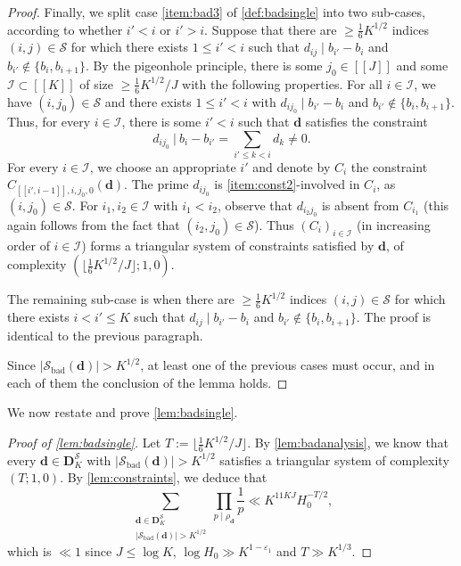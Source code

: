 \documentclass[11pt]{amsart}
\theoremstyle{definition}
\renewcommand{\leq}{\leqslant}
\renewcommand{\geq}{\geqslant}
\newcommand{\interval}[2]{[\![#1,#2]\!] }
\newcommand{\sinterval}[1]{[\![#1]\!] }
\newcommand{\abs}[1]{\left|#1\right|}
\newcommand{\eps}{\varepsilon}
\renewcommand{\d}{\boldsymbol{d}}
\newcommand{\pcomp}[2]{d_{#1#2}}
\newcommand{\cstH}{\eps_1}
\newcommand{\sommespart}{b}
\newcommand{\fprod}[1]{\rho_{#1}}
\newcommand{\pall}{\fprod{\d}}
\newcommand{\bmid}{\  \Big\vert}
\newcommand{\s}{\mathcal{S}}
\newcommand{\fancyD}{\mathbf{D}}
\newcommand{\Ds}{\fancyD^{\s}_{\!\repK}}
\newcommand{\indexset}{\mathcal{I}}
\newcommand{\repR}{J}
\newcommand{\repK}{K}
\newcommand{\newK}{\sinterval{K}}
\newcommand{\newR}{\sinterval{J}}
\newcommand{\kbad}{\s_{\mathrm{bad}}(\d)}
\newcommand{\ncond}{T}
\begin{document}
\begin{proof}
Finally, we split case \cref{item:bad3} of \cref{def:badsingle} into two sub-cases, according to whether $i'<i$ or $i'>i$. Suppose that there are $\geq \tfrac16 \repK^{1/2}$ indices $(i,j)\in \s$ for which there exists $1\leq i'<i$ such that $\pcomp{i}{j} \mid \sommespart_{i'}-\sommespart_{i}$ and $\sommespart_{i'}\not\in \{\sommespart_i,\sommespart_{i+1}\}$. By the pigeonhole principle, there is some $j_0\in \newR$ and some $\indexset \subset \newK$ of size $\geq \tfrac16 \repK^{1/2}/\repR$ with the following properties. For all $i\in \indexset$, we have $(i,j_0)\in \s$ and there exists $1\leq i'<i$ with $\pcomp{i}{j_0} \mid \sommespart_{i'}-\sommespart_{i}$ and $\sommespart_{i'}\not\in \{\sommespart_i,\sommespart_{i+1}\}$. Thus, for every $i\in \indexset$, there is some $i'<i$ such that $\d$ satisfies the constraint
\begin{equation*}
	\pcomp{i}{j_0} \bmid\ \sommespart_{i} - \sommespart_{i'} = \sum_{i'\leq k<i} d_k \neq 0.
\end{equation*}
For every $i\in \indexset$, we choose an appropriate $i'$ and denote by $C_i$ the constraint $C_{\interval{i'}{i-1},i,j_0,0}(\d)$. The prime $\pcomp{i}{j_0}$ is \cref{item:const2}-involved in $C_i$, as $(i,j_0)\in \s$. For $i_1,i_2\in \indexset$ with $i_1<i_2$, observe that $\pcomp{i_2}{j_0}$ is absent from $C_{i_1}$ (this again follows from the fact that $(i_2,j_0)\in \s$). Thus $(C_i)_{i\in \indexset}$ (in increasing order of $i\in \indexset$) forms a triangular system of constraints satisfied by $\d$, of complexity $(\lfloor \tfrac16 \repK^{1/2}/\repR\rfloor; 1, 0)$. 

The remaining sub-case is when there are $\geq \tfrac16 \repK^{1/2}$ indices $(i,j)\in \s$ for which there exists $i< i'\leq \repK$ such that $\pcomp{i}{j} \mid \sommespart_{i'}-\sommespart_{i}$ and $\sommespart_{i'}\not\in \{\sommespart_i,\sommespart_{i+1}\}$. The proof is identical to the previous paragraph. 

Since $\abs{\kbad} > \repK^{1/2}$, at least one of the previous cases must occur, and in each of them the conclusion of the lemma holds. 
\end{proof}


We now restate and prove \cref{lem:badsingle}.

\badsingle*

\begin{proof}[Proof of \cref{lem:badsingle}]
Let $\ncond := \big\lfloor \tfrac16 \repK^{1/2}/\repR\big\rfloor$.
By \cref{lem:badanalysis}, we know that every $\d\in \Ds$ with $|{\kbad}| >\repK^{1/2}$ satisfies a triangular system of complexity $(\ncond; 1, 0)$. By \cref{lem:constraints}, we deduce that
\begin{equation*}
		\sum_{\substack{\d\in \Ds \\ |{\kbad}| >\repK^{1/2} }} \prod_{p\mid \pall} \frac{1}{p} \ll \repK^{11\repK \repR} H_0^{-\ncond/2},
\end{equation*}
which is $\ll 1$ since $\repR \leq \log \repK$, ${\log H_0 \gg\repK^{1-\cstH}}$ and $\ncond \gg\repK^{1/3}$.
\end{proof}
\end{document}
